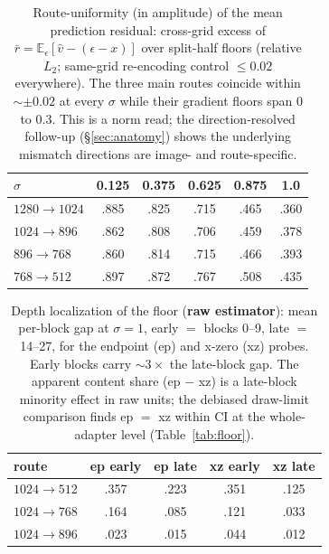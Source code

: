 \begin{table}[h]
\caption{Route-uniformity (in amplitude) of the mean prediction
residual: cross-grid
excess of $\bar r = \mathbb{E}_\epsilon[\hat v - (\epsilon - x)]$ over
split-half floors (relative $L_2$; same-grid re-encoding control
$\le 0.02$ everywhere). The three main routes coincide within
${\sim}\pm 0.02$ at every $\sigma$ while their gradient floors span $0$ to
$0.3$. This is a norm read; the direction-resolved follow-up
(\S\ref{sec:anatomy}) shows the underlying mismatch directions are
image- and route-specific.}
\label{tab:residual}
\centering
\small
\begin{tabular}{lccccc}
\toprule
$\sigma$ & 0.125 & 0.375 & 0.625 & 0.875 & 1.0 \\
\midrule
$1280{\to}1024$ & .885 & .825 & .715 & .465 & .360 \\
$1024{\to}896$  & .862 & .808 & .706 & .459 & .378 \\
$896{\to}768$   & .860 & .814 & .715 & .466 & .393 \\
$768{\to}512$   & .897 & .872 & .767 & .508 & .435 \\
\bottomrule
\end{tabular}
\end{table}

\begin{table}[h]
\caption{Depth localization of the floor (\textbf{raw estimator}): mean
per-block gap at
$\sigma{=}1$, early $=$ blocks 0--9, late $=$ 14--27, for the endpoint
(ep) and x-zero (xz) probes. Early blocks carry ${\sim}3\times$ the
late-block gap. The apparent content share (ep $-$ xz) is a late-block
minority effect in raw units; the debiased draw-limit comparison finds
ep $=$ xz within CI at the whole-adapter level
(Table~\ref{tab:floor}).}
\label{tab:depth}
\centering
\small
\begin{tabular}{lcccc}
\toprule
route & ep early & ep late & xz early & xz late \\
\midrule
$1024{\to}512$ & .357 & .223 & .351 & .125 \\
$1024{\to}768$ & .164 & .085 & .121 & .033 \\
$1024{\to}896$ & .023 & .015 & .044 & .012 \\
\bottomrule
\end{tabular}
\end{table}


